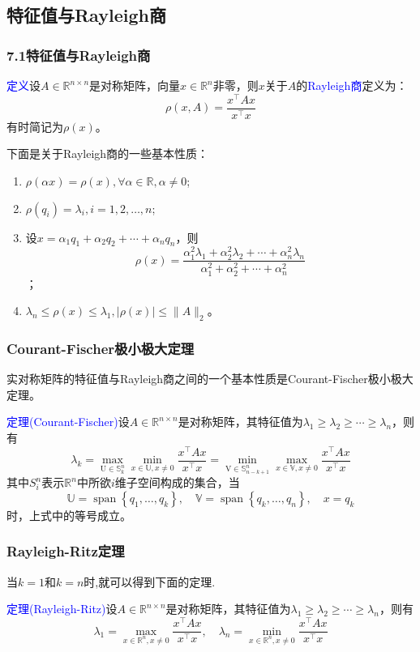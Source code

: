 \documentclass[notheorems,serif]{beamer}
\begin{document}
\subsection*{特征值与Rayleigh商}
\begin{frame}
\frametitle{7.1\qquad 特征值与Rayleigh商}



\textcolor{blue}{定义}\quad 设$A\in \mathbb{R}^{n\times n}$是对称矩阵，向量$x\in \mathbb{R}^n$非零，则$x$关于$A$的\textcolor{blue}{Rayleigh商}定义为：$$
\rho(x, A)=\frac{x^{\top} A x}{x^{\top} x}
$$
有时简记为$\rho(x)$。

下面是关于Rayleigh商的一些基本性质：
\begin{enumerate}[(1)]
	\item $\rho(\alpha x)=\rho(x), \forall \alpha \in \mathbb{R}, \alpha \neq 0$;
	\item $\rho\left(q_{i}\right)=\lambda_{i}, i=1,2, \dots, n$;
	\item 设$x=\alpha_{1} q_{1}+\alpha_{2} q_{2}+\cdots+\alpha_{n} q_{n}$，则$$
	\rho(x)=\frac{\alpha_{1}^{2} \lambda_{1}+\alpha_{2}^{2} \lambda_{2}+\cdots+\alpha_{n}^{2} \lambda_{n}}{\alpha_{1}^{2}+\alpha_{2}^{2}+\cdots+\alpha_{n}^{2}}
	$$；
	\item $\lambda_{n} \leq \rho(x) \leq \lambda_{1},|\rho(x)| \leq\|A\|_{2}$。
\end{enumerate}
\end{frame}
\begin{frame}
\frametitle{Courant-Fischer极小极大定理}


实对称矩阵的特征值与Rayleigh商之间的一个基本性质是Courant-Fischer极小极大定理。

\textcolor{blue}{定理(Courant-Fischer)}\quad 设$A \in \mathbb{R}^{n \times n}$是对称矩阵，其特征值为$\lambda_{1} \geq \lambda_{2} \geq \cdots \geq \lambda_{n}$，则有$$
\lambda_{k}=\max _{\mathrm{U} \in \mathbb{S}_{k}^{n}} \min _{x \in \mathbb{U}, x \neq 0} \frac{x^{\top} A x}{x^{\top} x}
=\min _{\mathrm{V} \in \mathbb{S}_{n-k+1}^{n}} \max _{x \in \mathbb{V}, x \neq 0} \frac{x^{\top} A x}{x^{\top} x}
$$
其中$S_{i}^{n}$表示$\mathbb{R}^{n}$中所欲$i$维子空间构成的集合，当$$
\mathbb{U}=\operatorname{span}\left\{q_{1}, \ldots, q_{k}\right\}, \quad \mathbb{V}=\operatorname{span}\left\{q_{k}, \ldots, q_{n}\right\}, \quad x=q_{k}
$$时，上式中的等号成立。
\end{frame}
\begin{frame}
\frametitle{Rayleigh-Ritz定理}


当$k= 1$和$k=n$时,就可以得到下面的定理.

\textcolor{blue}{定理(Rayleigh-Ritz)}\quad 设$A \in \mathbb{R}^{n \times n}$是对称矩阵，其特征值为$\lambda_{1} \geq \lambda_{2} \geq \cdots \geq \lambda_{n}$，则有$$
\lambda_{1}=\max _{x \in \mathbb{R}^{n}, x \neq 0} \frac{x^{\top} A x}{x^{\top} x}, \quad \lambda_{n}=\min _{x \in \mathbb{R}^{n}, x \neq 0} \frac{x^{\top} A x}{x^{\top} x}
$$
\end{frame}
\end{document}
